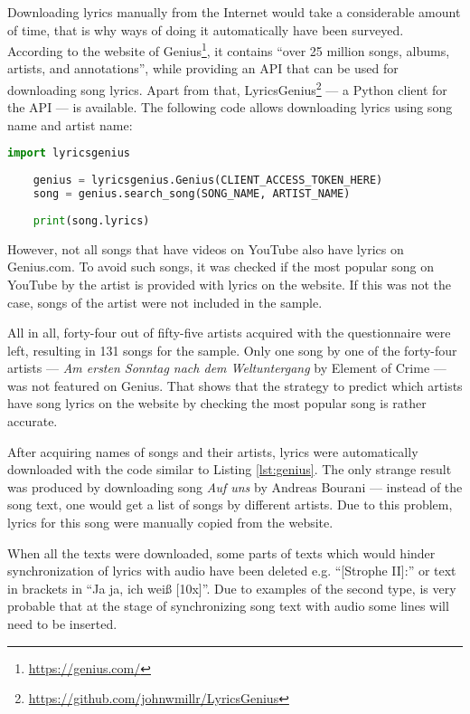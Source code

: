 Downloading lyrics manually from the Internet would take a considerable amount of time, that is why ways of doing it automatically have been surveyed. According to the website of Genius\footnote{\url{https://genius.com/}}, it contains ``over 25 million songs, albums, artists, and annotations'', while providing an API that can be used for downloading song lyrics. Apart from that, LyricsGenius\footnote{\url{https://github.com/johnwmillr/LyricsGenius}} --- a Python client for the API --- is available. The following code allows downloading lyrics using song name and artist name:

\begin{lstlisting}[language=Python, caption={Downloading song lyrics}, label={lst:genius}]
    import lyricsgenius
    
    genius = lyricsgenius.Genius(CLIENT_ACCESS_TOKEN_HERE)
    song = genius.search_song(SONG_NAME, ARTIST_NAME)
    
    print(song.lyrics)
\end{lstlisting}

However, not all songs that have videos on YouTube also have lyrics on Genius.com. To avoid such songs, it was checked if the most popular song on YouTube by the artist is provided with lyrics on the website. If this was not the case, songs of the artist were not included in the sample. 

All in all, forty-four out of fifty-five artists acquired with the questionnaire were left, resulting in 131 songs for the sample. Only one song by one of the forty-four artists --- \textit{Am ersten Sonntag nach dem Weltuntergang} by Element of Crime --- was not featured on Genius. That shows that the strategy to predict which artists have song lyrics on the website by checking the most popular song is rather accurate.

After acquiring names of songs and their artists, lyrics were automatically downloaded with the code similar to Listing \ref{lst:genius}. The only strange result was produced by downloading song \textit{Auf uns} by Andreas Bourani --- instead of the song text, one would get a list of songs by different artists. Due to this problem, lyrics for this song were manually copied from the website. 

When all the texts were downloaded, some parts of texts which would hinder synchronization of lyrics with audio have been deleted e.g. ``[Strophe II]:'' or text in brackets in ``Ja ja, ich weiß [10x]''. Due to examples of the second type, is very probable that at the stage of synchronizing song text with audio some lines will need to be inserted.